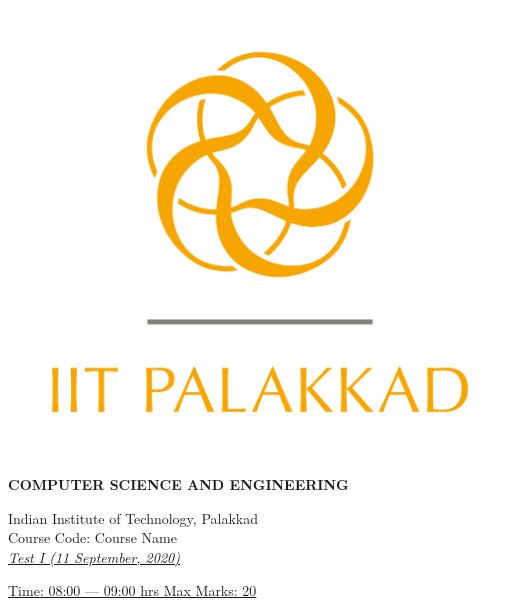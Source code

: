 \documentclass[11pt,paper=a4,answers]{exam}
\begin{document}
	
	
	\noindent
	\begin{minipage}[l]{.14\textwidth}%
		\noindent
		\includegraphics[scale=0.3]{logo}
	\end{minipage}
	\hfill
	\begin{minipage}[r]{.65\textwidth}%
		\begin{center}
			{\large \bfseries COMPUTER SCIENCE AND ENGINEERING \par
				\large Indian Institute of Technology, Palakkad \\[2pt]
				Course Code: Course Name\\
				\normalsize\emph{\underline{Test I (11 September, 2020)}}
			}
		\end{center}
	\end{minipage}
	\hfill
	\begin{minipage}[r]{.14\textwidth}%
		\noindent
		\begin{flushright}
			{\footnotesize }	
		\end{flushright}
	\end{minipage}
	\par
	\noindent
	\uline{ Time: 08:00 --- 09:00 hrs \hfill  Max Marks: 20 }
	
\end{document}
